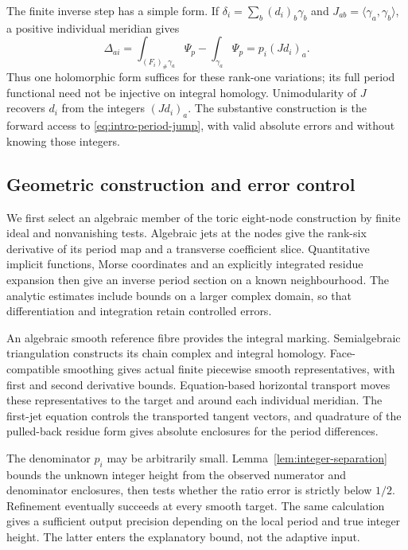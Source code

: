 The finite inverse step has a simple form. If
$\delta_i=\sum_b(d_i)_b\gamma_b$ and
$J_{ab}=\langle\gamma_a,\gamma_b\rangle$, a positive
individual meridian gives
\begin{equation}\label{eq:intro-period-jump}
 \Delta_{ai}
   =\int_{(F_i)_\#\gamma_a}\Psi_p-\int_{\gamma_a}\Psi_p
   =p_i(Jd_i)_a .
\end{equation}
Thus one holomorphic form suffices for these rank-one
variations; its full period functional need not be
injective on integral homology. Unimodularity of $J$
recovers $d_i$ from the integers $(Jd_i)_a$.
The substantive construction is the forward access
to \eqref{eq:intro-period-jump}, with valid absolute
errors and without knowing those integers.

\subsection{Geometric construction and error control}

We first select an algebraic member of the toric
eight-node construction by finite ideal and
nonvanishing tests. Algebraic jets at the nodes give
the rank-six derivative of its period map and a
transverse coefficient slice. Quantitative implicit
functions, Morse coordinates and an explicitly
integrated residue expansion then give an inverse
period section on a known neighbourhood.
The analytic estimates include bounds on a larger
complex domain, so that differentiation and
integration retain controlled errors.

An algebraic smooth reference fibre provides the
integral marking. Semialgebraic triangulation
constructs its chain complex and integral homology.
Face-compatible smoothing gives actual finite
piecewise smooth representatives, with first and
second derivative bounds. Equation-based horizontal
transport moves these representatives to the target
and around each individual meridian. The first-jet
equation controls the transported tangent vectors,
and quadrature of the pulled-back residue form gives
absolute enclosures for the period differences.

The denominator $p_i$ may be arbitrarily small.
Lemma~\ref{lem:integer-separation} bounds the unknown
integer height from the observed numerator and
denominator enclosures, then tests whether the ratio
error is strictly below $1/2$. Refinement eventually
succeeds at every smooth target.
The same calculation gives a sufficient output
precision depending on the local period and true
integer height. The latter enters the explanatory
bound, not the adaptive input.

